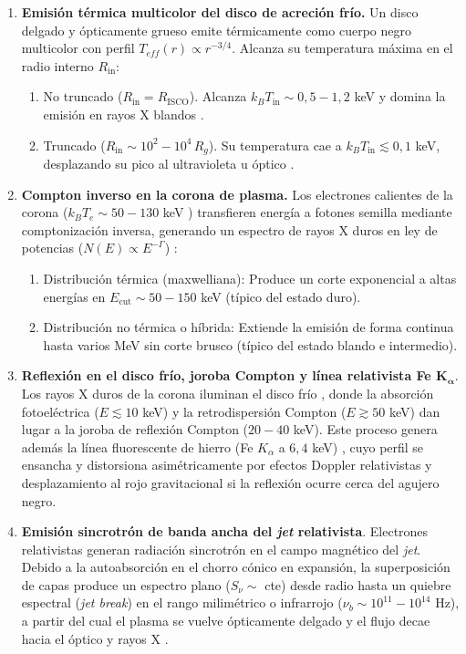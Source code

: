 \begin{enumerate}
    \item \textbf{Emisión térmica multicolor del disco de acreción frío.} Un disco delgado y ópticamente grueso emite térmicamente como cuerpo negro multicolor con perfil $T_{eff}(r)\propto r^{-3/4}$. Alcanza su temperatura máxima en el radio interno $R_{\mbox{in}}$:
    \begin{enumerate}
        \item No truncado ($R_{\mbox{in}} = R_{\mbox{ISCO}}$). Alcanza $k_B T_{\mbox{in}} \sim 0,5 - 1,2$ keV y domina la emisión en rayos X blandos \cite{fender_gallo,malzac}.
        \item Truncado ($R_{\mbox{in}} \sim 10^2 - 10^4\,R_g$). Su temperatura cae a $k_B T_{\mbox{in}} \lesssim 0,1$ keV, desplazando su pico al ultravioleta u óptico \cite{fender_gallo,mornas2026bloque1}.
    \end{enumerate}
    \item \textbf{Compton inverso en la corona de plasma.} Los electrones calientes de la corona ($k_B T_e \sim 50 - 130$ keV \cite{fender_gallo,malzac}) transfieren energía a fotones semilla mediante comptonización inversa, generando un espectro de rayos X duros en ley de potencias ($N(E) \propto E^{-\Gamma}$) \cite{malzac}:
    \begin{enumerate}
        \item Distribución térmica (maxwelliana): Produce un corte exponencial a altas energías en $E_{\mbox{cut}} \sim 50 - 150$ keV (típico del estado duro).
        \item Distribución no térmica o híbrida: Extiende la emisión de forma continua hasta varios MeV sin corte brusco (típico del estado blando e intermedio). 
    \end{enumerate}
    \item \textbf{Reflexión en el disco frío, joroba Compton y línea relativista Fe $\mathbf{K_\alpha}$}. Los rayos X duros de la corona iluminan el disco frío \cite{malzac}, donde la absorción fotoeléctrica ($E \lesssim 10$ keV) y la retrodispersión Compton ($E \gtrsim 50$ keV) dan lugar a la joroba de reflexión Compton ($20 - 40$ keV). Este proceso genera además la línea fluorescente de hierro (Fe $K_\alpha$ a $6,4$ keV) \cite{mirabel,malzac}, cuyo perfil se ensancha y distorsiona asimétricamente por efectos Doppler relativistas y desplazamiento al rojo gravitacional si la reflexión ocurre cerca del agujero negro.
    \item \textbf{Emisión sincrotrón de banda ancha del \textit{jet} relativista}. Electrones relativistas generan radiación sincrotrón en el campo magnético del \textit{jet}. Debido a la autoabsorción en el chorro cónico en expansión, la superposición de capas produce un espectro plano ($S_\nu \sim$ cte) desde radio hasta un quiebre espectral (\textit{jet break}) en el rango milimétrico o infrarrojo ($\nu_b \sim 10^{11} - 10^{14}$ Hz), a partir del cual el plasma se vuelve ópticamente delgado y el flujo decae hacia el óptico y rayos X \cite{fender_gallo,malzac}.
\end{enumerate}

